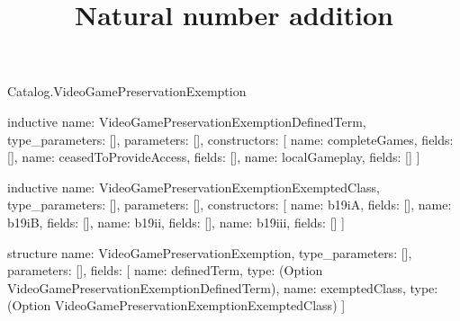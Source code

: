 \begin{lexlean}{Catalog.VideoGamePreservationExemption}
\title{Natural number addition}
\begin{semanticmodule}
inductive{
  name: VideoGamePreservationExemptionDefinedTerm,
  type_parameters: [],
  parameters: [],
  constructors: [
    {name: completeGames, fields: []},
    {name: ceasedToProvideAccess, fields: []},
    {name: localGameplay, fields: []}
  ]
}

inductive{
  name: VideoGamePreservationExemptionExemptedClass,
  type_parameters: [],
  parameters: [],
  constructors: [
    {name: b19iA, fields: []},
    {name: b19iB, fields: []},
    {name: b19ii, fields: []},
    {name: b19iii, fields: []}
  ]
}

structure{
  name: VideoGamePreservationExemption,
  type_parameters: [],
  parameters: [],
  fields: [
    {name: definedTerm, type: (Option VideoGamePreservationExemptionDefinedTerm)},
    {name: exemptedClass, type: (Option VideoGamePreservationExemptionExemptedClass)}
  ]
}
\end{semanticmodule}
\end{lexlean}
